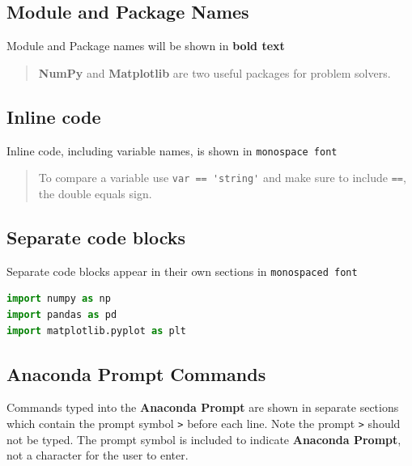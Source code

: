 \documentclass{book}
\begin{document}
    
        \subsection{Module and Package Names}\label{module-and-package-names}

Module and Package names will be shown in \textbf{bold text}

\begin{quote}
\textbf{NumPy} and \textbf{Matplotlib} are two useful packages for
problem solvers.
\end{quote}
    




    
        \subsection{Inline code}\label{inline-code}

Inline code, including variable names, is shown in
\lstinline!monospace font!

\begin{quote}
To compare a variable use \lstinline!var == 'string'! and make sure to
include \lstinline!==!, the double equals sign.
\end{quote}
    




    
        \subsection{Separate code blocks}\label{separate-code-blocks}

Separate code blocks appear in their own sections in
\lstinline!monospaced font!

\begin{lstlisting}[language=Python]
import numpy as np
import pandas as pd
import matplotlib.pyplot as plt
\end{lstlisting}
    




    
        \subsection{Anaconda Prompt Commands}\label{anaconda-prompt-commands}

Commands typed into the \textbf{Anaconda Prompt} are shown in separate
sections which contain the prompt symbol \lstinline!>! before each line.
Note the prompt \lstinline!>! should not be typed. The prompt symbol is
included to indicate \textbf{Anaconda Prompt}, not a character for the
user to enter.
\end{document}
